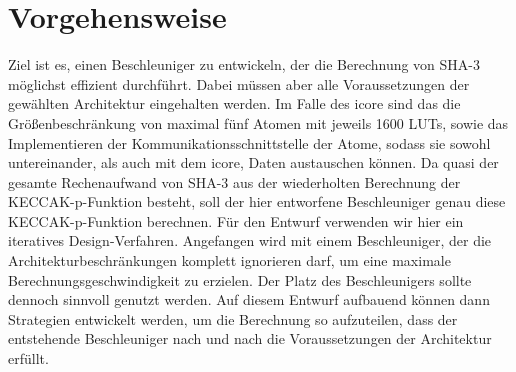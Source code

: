 \section{Vorgehensweise}
Ziel ist es, einen Beschleuniger zu entwickeln, der die Berechnung von SHA-3 möglichst effizient durchführt.
Dabei müssen aber alle Voraussetzungen der gewählten Architektur eingehalten werden. Im Falle des icore sind
das die Größenbeschränkung von maximal fünf Atomen mit jeweils 1600 LUTs, sowie das Implementieren der
Kommunikationsschnittstelle der Atome, sodass sie sowohl untereinander, als auch mit dem icore, Daten austauschen können.
Da quasi der gesamte Rechenaufwand von SHA-3 aus der wiederholten Berechnung der KECCAK-p-Funktion besteht,
soll der hier entworfene Beschleuniger genau diese KECCAK-p-Funktion berechnen.
Für den Entwurf verwenden wir hier ein iteratives Design-Verfahren. Angefangen wird mit einem Beschleuniger,
der die Architekturbeschränkungen komplett ignorieren darf, um eine maximale Berechnungsgeschwindigkeit zu erzielen.
Der Platz des Beschleunigers sollte dennoch sinnvoll genutzt werden. Auf diesem Entwurf aufbauend können dann
Strategien entwickelt werden, um die Berechnung so aufzuteilen, dass der entstehende Beschleuniger nach und nach die
Voraussetzungen der Architektur erfüllt.